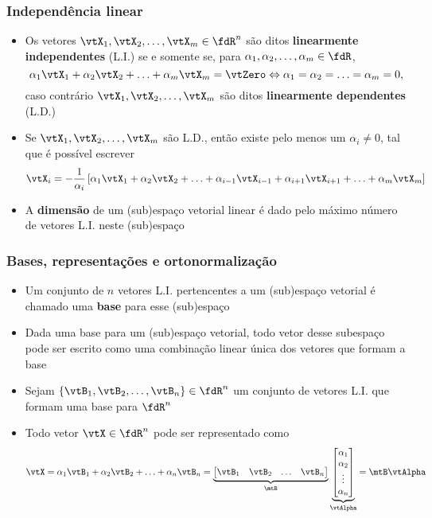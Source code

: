 \begin{frame}
  \frametitle{Independência linear \cite[cap. 3]{Chen1999}}
  \begin{itemize}
    \item Os vetores $\vtX_1, \vtX_2, \ldots, \vtX_m \in \fdR^n$ são ditos \textbf{\alert{linearmente independentes}} (L.I.) se e somente se, para $\alpha_1, \alpha_2, \ldots, \alpha_m \in \fdR$,
    \begin{equation}\label{eq_indep_lin}
      \alpha_1\vtX_1 + \alpha_2\vtX_2 + \ldots + \alpha_m\vtX_m = \vtZero \Leftrightarrow \alpha_1 = \alpha_2 = \ldots = \alpha_m = 0,
    \end{equation}
    caso contrário $\vtX_1, \vtX_2, \ldots, \vtX_m$ são ditos \textbf{\alert{linearmente dependentes}} (L.D.)
    \item Se $\vtX_1, \vtX_2, \ldots, \vtX_m$ são L.D., então existe pelo menos um $\alpha_i \neq 0$, tal que é possível escrever
    {\small\begin{equation}
      \vtX_i = -\frac{1}{\alpha_i}\left[\alpha_1\vtX_1 + \alpha_2\vtX_2 + \ldots + \alpha_{i-1}\vtX_{i-1} + \alpha_{i+1}\vtX_{i+1} + \ldots + \alpha_m\vtX_m\right]
    \end{equation}}
    \item A \textbf{\alert{dimensão}} de um (sub)espaço vetorial linear é dado pelo máximo número de vetores L.I. neste (sub)espaço
  \end{itemize}
\end{frame}

\begin{frame}
  \frametitle{Bases, representações e ortonormalização}
  \begin{itemize}
    \item Um conjunto de $n$ vetores L.I. pertencentes a um (sub)espaço vetorial é chamado uma \textbf{\alert{base}} para esse (sub)espaço
    \item Dada uma base para um (sub)espaço vetorial, todo vetor desse subespaço pode ser escrito como uma combinação linear única dos vetores que formam a base
    \item Sejam $\left\{\vtB_1, \vtB_2, \ldots, \vtB_n\right\} \in \fdR^n$ um conjunto de vetores L.I. que formam uma base para $\fdR^n$
    \item Todo vetor $\vtX \in \fdR^n$ pode ser representado como
    \begin{equation}
      \vtX = \alpha_1\vtB_1+\alpha_2\vtB_2+\ldots+\alpha_n\vtB_n = \underbrace{\left[\begin{matrix}\vtB_1 &\vtB_2 &\ldots & \vtB_n\end{matrix}\right]}_{\mtB}\underbrace{\left[\begin{matrix}\alpha_1 \\ \alpha_2 \\ \vdots \\ \alpha_n\end{matrix}\right]}_{\vtAlpha} = \mtB\vtAlpha
    \end{equation}
  \end{itemize}
\end{frame}

